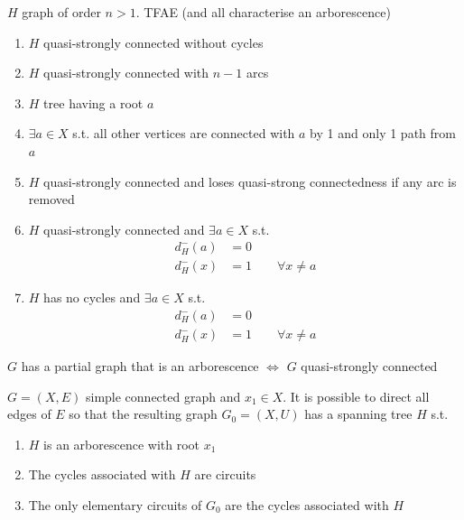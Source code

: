 \documentclass[aspectratio=169]{beamer}
\begin{document}
\begin{frame}
\begin{theorem}
$H$ graph of order $n>1$. TFAE (and all characterise an arborescence)
\begin{enumerate}
\item $H$ quasi-strongly connected without cycles
\item $H$ quasi-strongly connected with $n-1$ arcs
\item $H$ tree having a root $a$
\item $\exists a\in X$ s.t. all other vertices are connected with $a$ by 1 and only 1 path from $a$
\item $H$ quasi-strongly connected and loses quasi-strong connectedness if any arc is removed
\item $H$ quasi-strongly connected and $\exists a\in X$ s.t.
\begin{align*}
d_H^-(a)&=0 \\
d_H^-(x)&=1\qquad \forall x\neq a
\end{align*}
\item $H$ has no cycles and $\exists a\in X$ s.t.
\begin{align*}
d_H^-(a)&=0 \\
d_H^-(x)&=1\qquad \forall x\neq a
\end{align*}
\end{enumerate}
\end{theorem}
\end{frame}


\begin{frame}
\begin{theorem}
$G$ has a partial graph that is an arborescence $\iff$ $G$ quasi-strongly connected
\end{theorem}
\vfill
\begin{theorem}
$G=(X,E)$ simple connected graph and $x_1\in X$. It is possible to direct all edges of $E$ so that the resulting graph $G_0=(X,U)$ has a spanning tree $H$ s.t.
\begin{enumerate}
	\item $H$ is an arborescence with root $x_1$
	\item The cycles associated with $H$ are circuits
	\item The only elementary circuits of $G_0$ are the cycles associated with $H$
\end{enumerate}
\end{theorem}
\end{frame}
\end{document}
